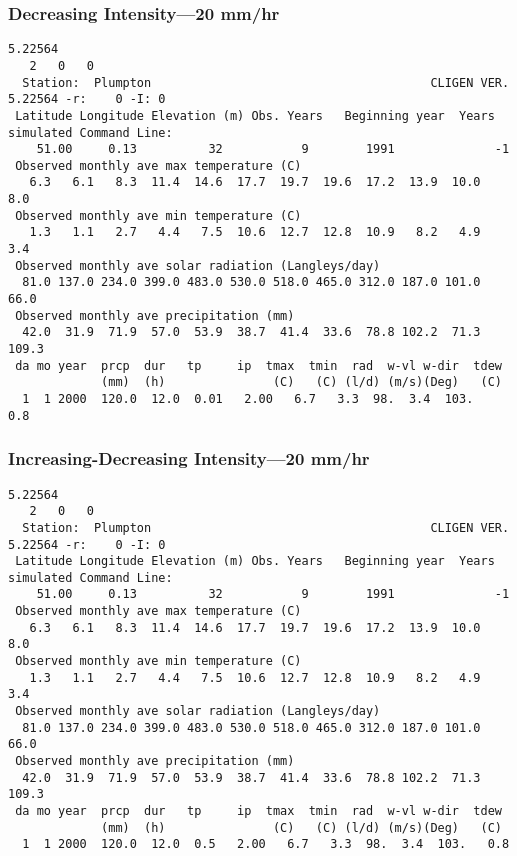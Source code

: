 \subsubsection{Decreasing Intensity---20 mm/hr}
\label{sec:DecreasingIntensity20MmHr}

\begin{verbatim}
5.22564
   2   0   0
  Station:  Plumpton                                       CLIGEN VER. 5.22564 -r:    0 -I: 0
 Latitude Longitude Elevation (m) Obs. Years   Beginning year  Years simulated Command Line:
    51.00     0.13          32           9        1991              -1          
 Observed monthly ave max temperature (C)
   6.3   6.1   8.3  11.4  14.6  17.7  19.7  19.6  17.2  13.9  10.0   8.0
 Observed monthly ave min temperature (C)
   1.3   1.1   2.7   4.4   7.5  10.6  12.7  12.8  10.9   8.2   4.9   3.4
 Observed monthly ave solar radiation (Langleys/day)
  81.0 137.0 234.0 399.0 483.0 530.0 518.0 465.0 312.0 187.0 101.0  66.0
 Observed monthly ave precipitation (mm)
  42.0  31.9  71.9  57.0  53.9  38.7  41.4  33.6  78.8 102.2  71.3 109.3
 da mo year  prcp  dur   tp     ip  tmax  tmin  rad  w-vl w-dir  tdew
             (mm)  (h)               (C)   (C) (l/d) (m/s)(Deg)   (C)
  1  1 2000  120.0  12.0  0.01   2.00   6.7   3.3  98.  3.4  103.   0.8
\end{verbatim}

\subsubsection{Increasing-Decreasing Intensity---20 mm/hr}
\label{sec:IncreasingDecreasingIntensity20MmHr}

\begin{verbatim}
5.22564
   2   0   0
  Station:  Plumpton                                       CLIGEN VER. 5.22564 -r:    0 -I: 0
 Latitude Longitude Elevation (m) Obs. Years   Beginning year  Years simulated Command Line:
    51.00     0.13          32           9        1991              -1          
 Observed monthly ave max temperature (C)
   6.3   6.1   8.3  11.4  14.6  17.7  19.7  19.6  17.2  13.9  10.0   8.0
 Observed monthly ave min temperature (C)
   1.3   1.1   2.7   4.4   7.5  10.6  12.7  12.8  10.9   8.2   4.9   3.4
 Observed monthly ave solar radiation (Langleys/day)
  81.0 137.0 234.0 399.0 483.0 530.0 518.0 465.0 312.0 187.0 101.0  66.0
 Observed monthly ave precipitation (mm)
  42.0  31.9  71.9  57.0  53.9  38.7  41.4  33.6  78.8 102.2  71.3 109.3
 da mo year  prcp  dur   tp     ip  tmax  tmin  rad  w-vl w-dir  tdew
             (mm)  (h)               (C)   (C) (l/d) (m/s)(Deg)   (C)
  1  1 2000  120.0  12.0  0.5   2.00   6.7   3.3  98.  3.4  103.   0.8
\end{verbatim}

